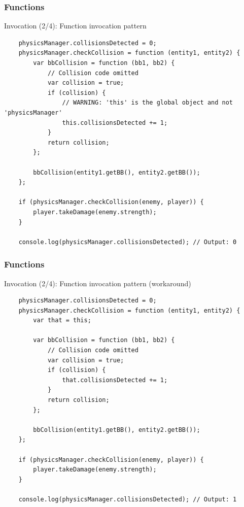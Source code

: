 \begin{frame}[fragile]
  \frametitle{Functions}

  \begin{block}{Invocation (2/4): Function invocation pattern}
    {\tiny
    \begin{verbatim}
    physicsManager.collisionsDetected = 0;
    physicsManager.checkCollision = function (entity1, entity2) {
        var bbCollision = function (bb1, bb2) {
            // Collision code omitted
            var collision = true;
            if (collision) {
                // WARNING: 'this' is the global object and not 'physicsManager'
                this.collisionsDetected += 1;
            }
            return collision;
        };

        bbCollision(entity1.getBB(), entity2.getBB());
    };

    if (physicsManager.checkCollision(enemy, player)) {
        player.takeDamage(enemy.strength);
    }

    console.log(physicsManager.collisionsDetected); // Output: 0
    \end{verbatim}
    }
  \end{block}
\end{frame}

\begin{frame}[fragile]
  \frametitle{Functions}

  \begin{block}{Invocation (2/4): Function invocation pattern (workaround)}
    {\tiny
    \begin{verbatim}
    physicsManager.collisionsDetected = 0;
    physicsManager.checkCollision = function (entity1, entity2) {
        var that = this;

        var bbCollision = function (bb1, bb2) {
            // Collision code omitted
            var collision = true;
            if (collision) {
                that.collisionsDetected += 1;
            }
            return collision;
        };

        bbCollision(entity1.getBB(), entity2.getBB());
    };

    if (physicsManager.checkCollision(enemy, player)) {
        player.takeDamage(enemy.strength);
    }

    console.log(physicsManager.collisionsDetected); // Output: 1
    \end{verbatim}
    }
  \end{block}
\end{frame}

